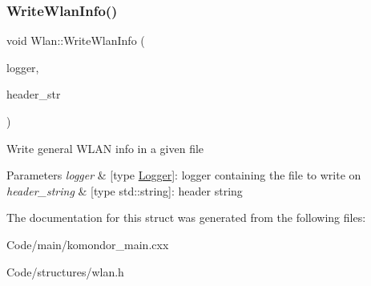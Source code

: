 \subsubsection{\texorpdfstring{Write\+Wlan\+Info()}{WriteWlanInfo()}}
{\footnotesize\ttfamily void Wlan\+::\+Write\+Wlan\+Info (\begin{DoxyParamCaption}\item[{\hyperlink{structLogger}{Logger}}]{logger,  }\item[{std\+::string}]{header\+\_\+str }\end{DoxyParamCaption})\hspace{0.3cm}{\ttfamily [inline]}}

Write general W\+L\+AN info in a given file 
\begin{DoxyParams}{Parameters}
{\em logger} & \mbox{[}type \hyperlink{structLogger}{Logger}\mbox{]}\+: logger containing the file to write on \\
\hline
{\em header\+\_\+string} & \mbox{[}type std\+::string\mbox{]}\+: header string \\
\hline
\end{DoxyParams}


The documentation for this struct was generated from the following files\+:\begin{DoxyCompactItemize}
\item 
Code/main/komondor\+\_\+main.\+cxx\item 
Code/structures/wlan.\+h\end{DoxyCompactItemize}
